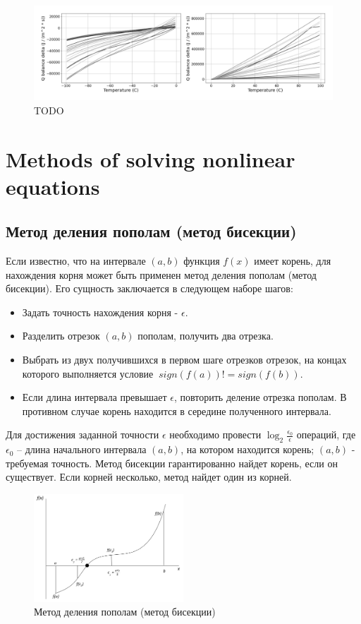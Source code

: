 \documentclass[
11pt,%
tightenlines,%
twoside,%
onecolumn,%
nofloats,%
nobibnotes,%
nofootinbib,%
superscriptaddress,%
noshowpacs,%
centertags]%
{revtex4}
\begin{document}
\begin{figure}[h]
\setcaptionmargin{5mm}
\onelinecaptionstrue
\includegraphics[width=1.0\textwidth]{pics/dq_rime_wet.pdf}
\caption{TODO}\label{fig:dq_rime_wet}
\end{figure}

\section{Methods of solving nonlinear equations}

\subsection{Метод деления пополам (метод бисекции)}
Если известно, что на интервале $(a, b)$ функция $f(x)$ имеет корень, для нахождения корня может быть применен метод деления пополам (метод бисекции). Его сущность заключается в следующем наборе шагов:
\begin{itemize}
\item Задать точность нахождения корня - $\epsilon$.
\item Разделить отрезок $(a, b)$ пополам, получить два отрезка.
\item Выбрать из двух получившихся в первом шаге отрезков отрезок, на концах которого выполняется условие $\ sign(f(a)) != sign(f(b))$.
\item Если длина интервала превышает $\epsilon$, повторить деление отрезка пополам. В противном случае корень находится в середине полученного интервала.
\end{itemize}
	
Для достижения заданной точности $\epsilon$ необходимо провести $\log_2\frac{\epsilon_0}{\epsilon}$  операций, где $\epsilon_0$ – длина начального интервала $(a, b)$, на котором находится корень; $(a, b)$ - требуемая точность. Метод бисекции гарантированно найдет корень, если он существует. Если корней несколько, метод найдет один из корней.

\begin{figure}[h]
\setcaptionmargin{5mm}
\onelinecaptionstrue
\includegraphics[width=0.5\textwidth]{pics/bisect.png}
\caption{Метод деления пополам (метод бисекции)}\label{fig:dq_rime_wet}
\end{figure}
\end{document}
